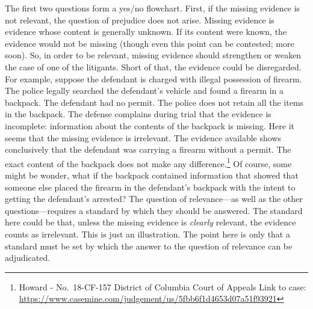\documentclass[
  10pt,
  dvipsnames,enabledeprecatedfontcommands]{scrartcl}
\begin{document}
The first two questions form a yes/no flowchart. First, if the missing
evidence is not relevant, the question of prejudice does not arise.
Missing evidence is evidence whose content is generally unknown. If its
content were known, the evidence would not be missing (though even this
point can be contested; more soon). So, in order to be relevant, missing
evidence should strengthen or weaken the case of one of the litigants.
Short of that, the evidence could be disregarded. For example, suppose
the defendant is charged with illegal possession of firearm. The police
legally searched the defendant's vehicle and found a firearm in a
backpack. The defendant had no permit. The police does not retain all
the items in the backpack. The defense complains during trial that the
evidence is incomplete: information about the contents of the backpack
is missing. Here it seems that the missing evidence is irrelevant. The
evidence available shows conclusively that the defendant was carrying a
firearm without a permit. The exact content of the backpack does not
make any difference.\footnote{Howard - No.~18-CF-157 District of
  Columbia Court of Appeals Link to case:
  \url{https://www.casemine.com/judgement/us/5fbb6f1d4653d07a51f93921}}
Of course, some might be wonder, what if the backpack contained
information that showed that someone else placed the firearm in the
defendant's backpack with the intent to getting the defendant's
arrested? The question of relevance---as well as the other
questions---requires a standard by which they should be answered. The
standard here could be that, unless the missing evidence is
\textit{clearly} relevant, the evidence counts as irrelevant. This is
just an illustration. The point here is only that a standard must be set
by which the answer to the question of relevance can be adjudicated.
\end{document}
